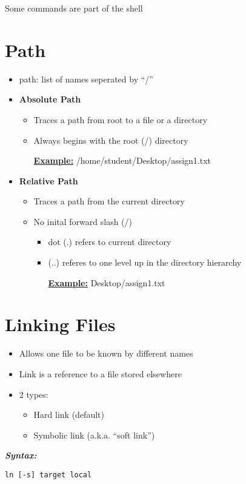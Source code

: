 \documentclass{report}
\begin{document}
\noindent Some commands are part of the shell
\section{Path}
\begin{itemize}
  \item path: list of names seperated  by ``/''
  \item \textbf{Absolute Path}
    \begin{itemize}[label=$\circ$]
      \item Traces a path from root to a file or a directory
      \item Always begins with the root (/) directory \vspace{1mm}
        
       \noindent \textbf{\underline{Example:}} /home/student/Desktop/assign1.txt
    \end{itemize}
  \item \textbf{Relative Path}
    \begin{itemize}[label=$\circ$]
      \item Traces a path from the current directory
      \item No inital forward slash (/)
        \begin{itemize}[label=$\circ$]
          \item dot (.) refers to current directory
          \item (..) referes to one level up in the directory hierarchy \vspace{1.5mm}

       \noindent \textbf{\underline{Example:}} Desktop/assign1.txt
        \end{itemize}
    \end{itemize}
\end{itemize}
\section{Linking Files}
\begin{itemize}
  \item Allows one file to be known by different names 
  \item Link is a reference to a file stored elsewhere
    \bigbreak \noindent
  \item 2 types:
    \begin{itemize}[label=$\circ$]
      \item Hard link (default) 
      \item Symbolic link (a.k.a. ``soft link'')
    \end{itemize}
\end{itemize}
\bigbreak \noindent
\textbf{\textit{Syntax:}}
\begin{verbatim}
ln [-s] target local
\end{verbatim}
\newpage
\end{document}
